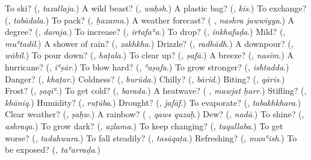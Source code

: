 \begin{tcolorbox}[breakable,colback=teal!4,colframe=teal!35!black,title={Before you move on}]
To ski? (\textbf{}, \emph{tazallaja}.) A wild beast? (\textbf{}, \emph{waḥsh}.) A plastic bag? (\textbf{}, \emph{kīs}.) To exchange? (\textbf{}, \emph{tabādala}.) To pack? (\textbf{}, \emph{ḥazama}.) A weather forecast? (\textbf{ }, \emph{nashra jawwiyya}.) A degree? (\textbf{}, \emph{daraja}.) To increase? (\textbf{}, \emph{irtafaʿa}.) To drop? (\textbf{}, \emph{inkhafaḍa}.) Mild? (\textbf{}, \emph{muʿtadil}.) A shower of rain? (\textbf{}, \emph{zakhkha}.) Drizzle? (\textbf{}, \emph{radhādh}.) A downpour? (\textbf{}, \emph{wābil}.) To pour down? (\textbf{}, \emph{haṭala}.) To clear up? (\textbf{}, \emph{ṣafā}.) A breeze? (\textbf{}, \emph{nasīm}.) A hurricane? (\textbf{}, \emph{iʿṣār}.) To blow hard? (\textbf{}, \emph{ʿaṣafa}.) To grow stronger? (\textbf{}, \emph{ishtadda}.) Danger? (\textbf{}, \emph{khaṭar}.) Coldness? (\textbf{}, \emph{burūda}.) Chilly? (\textbf{}, \emph{bārid}.) Biting? (\textbf{}, \emph{qāris}.) Frost? (\textbf{}, \emph{ṣaqīʿ}.) To get cold? (\textbf{}, \emph{barada}.) A heatwave? (\textbf{ }, \emph{mawjat ḥarr}.) Stifling? (\textbf{}, \emph{khāniq}.) Humidity? (\textbf{}, \emph{ruṭūba}.) Drought? (\textbf{}, \emph{jafāf}.) To evaporate? (\textbf{}, \emph{tabakhkhara}.) Clear weather? (\textbf{}, \emph{ṣaḥw}.) A rainbow? (\textbf{ }, \emph{qaws quzaḥ}.) Dew? (\textbf{}, \emph{nadā}.) To shine? (\textbf{}, \emph{ashraqa}.) To grow dark? (\textbf{}, \emph{aẓlama}.) To keep changing? (\textbf{}, \emph{taqallaba}.) To get worse? (\textbf{}, \emph{tadahwara}.) To fall steadily? (\textbf{}, \emph{tasāqaṭa}.) Refreshing? (\textbf{}, \emph{munʿish}.) To be exposed? (\textbf{}, \emph{taʿarraḍa}.)
\end{tcolorbox}
